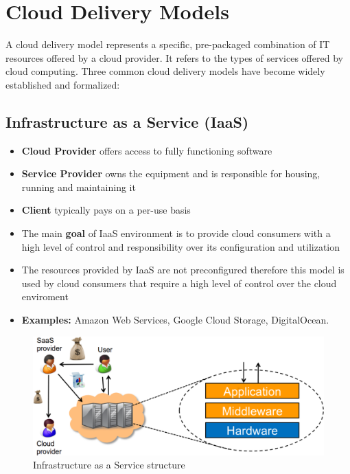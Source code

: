 \section{Cloud Delivery Models}
A cloud delivery model represents a specific, pre-packaged combination of IT resources offered by a cloud provider. It refers to the types of services offered by cloud computing. Three common cloud delivery models have become widely established and formalized:
\subsection{Infrastructure as a Service (IaaS)} 
    \begin{itemize}
        \item \textbf{Cloud Provider} offers access to fully functioning software
        \item \textbf{Service Provider} owns the equipment and is responsible for housing, running and maintaining it
        \item \textbf{Client} typically pays on a per-use basis
        \item The main \textbf{goal} of IaaS environment is to provide cloud consumers with a high level of control and responsibility over its configuration and utilization
        \item The resources provided by IaaS are not preconfigured therefore this model is used by cloud consumers that require a high level of control over the cloud enviroment
        \item \textbf{Examples:} Amazon Web Services, Google Cloud Storage, DigitalOcean.
    \end{itemize}
    
\begin{figure}[!h]
    \centering
    \includegraphics[width=.60\linewidth]{images/CloudComputing/iaas.png}
    \caption{Infrastructure as a Service structure}
\end{figure}

